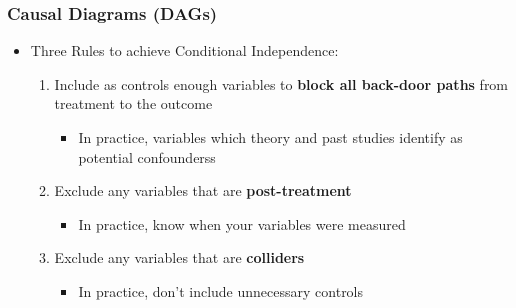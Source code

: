 \documentclass[xcolor=x11names,compress]{beamer}\usepackage[]{graphicx}\usepackage[]{color}
\renewcommand{\(}{\begin{columns}}
\renewcommand{\)}{\end{columns}}
\newcommand{\<}[1]{\begin{column}{#1}}
\renewcommand{\>}{\end{column}}
\begin{document}
\begin{frame}
\frametitle{Causal Diagrams (DAGs)}
\begin{itemize}
\item Three Rules to achieve Conditional Independence:
\begin{enumerate}
\item Include as controls enough variables to \textbf{block all back-door paths} from treatment to the outcome
\pause
\begin{itemize}
\item In practice, variables which theory and past studies identify as potential confounderss
\end{itemize}
\pause
\item Exclude any variables that are \textbf{post-treatment}
\pause
\begin{itemize}
\item In practice, know when your variables were measured
\end{itemize}
\pause
\item Exclude any variables that are \textbf{colliders}
\pause
\begin{itemize}
\item In practice, don't include unnecessary controls
\end{itemize}
\end{enumerate}
\end{itemize}
\end{frame}
\end{document}
